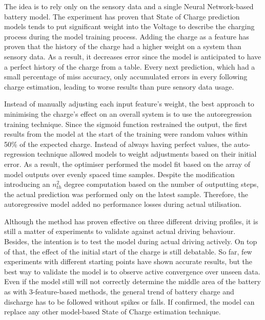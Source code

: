 The idea is to rely only on the sensory data and a single Neural Network-based battery model.
The experiment has proven that State of Charge prediction models tends to put significant weight into the Voltage to describe the charging process during the model training process.
Adding the charge as a feature has proven that the history of the charge had a higher weight on a system than sensory data.
As a result, it decreases error since the model is anticipated to have a perfect history of the charge from a table.
Every next prediction, which had a small percentage of miss accuracy, only accumulated errors in every following charge estimation, leading to worse results than pure sensory data usage.

%
%
Instead of manually adjusting each input feature's weight, the best approach to minimising the charge's effect on an overall system is to use the autoregression training technique. 
Since the sigmoid function restrained the output, the first results from the model at the start of the training were random values within 50\% of the expected charge.
Instead of always having perfect values, the auto-regression technique allowed models to weight adjustments based on their initial error.
As a result, the optimiser performed the model fit based on the array of model outputs over evenly spaced time samples.
Despite the modification introducing an $n_{th}^{2}$ degree computation based on the number of outputting steps, the actual prediction was performed only on the latest sample.
Therefore, the autoregressive model added no performance losses during actual utilisation. 

%
%
Although the method has proven effective on three different driving profiles, it is still a matter of experiments to validate against actual driving behaviour.
Besides, the intention is to test the model during actual driving actively.
On top of that, the effect of the initial start of the charge is still debatable.
So far, few experiments with different starting points have shown accurate results, but the best way to validate the model is to observe active convergence over unseen data.
Even if the model still will not correctly determine the middle area of the battery as with 3-feature-based methods, the general trend of battery charge and discharge has to be followed without spikes or falls.
If confirmed, the model can replace any other model-based State of Charge estimation technique.
